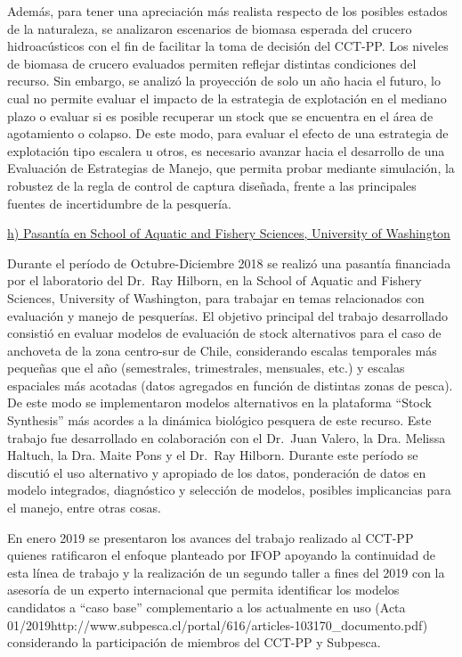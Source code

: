 \documentclass[
  spanish,
]{article}
\begin{document}
Además, para tener una apreciación más realista respecto de los posibles
estados de la naturaleza, se analizaron escenarios de biomasa esperada
del crucero hidroacústicos con el fin de facilitar la toma de decisión
del CCT-PP. Los niveles de biomasa de crucero evaluados permiten
reflejar distintas condiciones del recurso. Sin embargo, se analizó la
proyección de solo un año hacia el futuro, lo cual no permite evaluar el
impacto de la estrategia de explotación en el mediano plazo o evaluar si
es posible recuperar un stock que se encuentra en el área de agotamiento
o colapso. De este modo, para evaluar el efecto de una estrategia de
explotación tipo escalera u otros, es necesario avanzar hacia el
desarrollo de una Evaluación de Estrategias de Manejo, que permita
probar mediante simulación, la robustez de la regla de control de
captura diseñada, frente a las principales fuentes de incertidumbre de
la pesquería.

\vspace{0.3cm}

\underline{h) Pasantía en School of Aquatic and Fishery Sciences, University of Washington}

Durante el período de Octubre-Diciembre 2018 se realizó una pasantía
financiada por el laboratorio del Dr.~Ray Hilborn, en la School of
Aquatic and Fishery Sciences, University of Washington, para trabajar en
temas relacionados con evaluación y manejo de pesquerías. El objetivo
principal del trabajo desarrollado consistió en evaluar modelos de
evaluación de stock alternativos para el caso de anchoveta de la zona
centro-sur de Chile, considerando escalas temporales más pequeñas que el
año (semestrales, trimestrales, mensuales, etc.) y escalas espaciales
más acotadas (datos agregados en función de distintas zonas de pesca).
De este modo se implementaron modelos alternativos en la plataforma
``Stock Synthesis'' más acordes a la dinámica biológico pesquera de este
recurso. Este trabajo fue desarrollado en colaboración con el Dr.~Juan
Valero, la Dra. Melissa Haltuch, la Dra. Maite Pons y el Dr.~Ray
Hilborn. Durante este período se discutió el uso alternativo y apropiado
de los datos, ponderación de datos en modelo integrados, diagnóstico y
selección de modelos, posibles implicancias para el manejo, entre otras
cosas.

En enero 2019 se presentaron los avances del trabajo realizado al CCT-PP
quienes ratificaron el enfoque planteado por IFOP apoyando la
continuidad de esta línea de trabajo y la realización de un segundo
taller a fines del 2019 con la asesoría de un experto internacional que
permita identificar los modelos candidatos a ``caso base''
complementario a los actualmente en uso (Acta
01/2019http://www.subpesca.cl/portal/616/articles-103170\_documento.pdf)
considerando la participación de miembros del CCT-PP y Subpesca.
\end{document}
